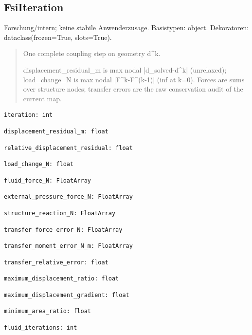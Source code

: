 \subsection{FsiIteration}
Forschung/intern; keine stabile Anwenderzusage.
Basistypen: object. Dekoratoren: dataclass(frozen=True, slots=True).
\begin{quote}
One complete coupling step on geometry d\textasciicircum{}k.\par displacement\_residual\_m is max nodal |d\_solved-d\textasciicircum{}k| (unrelaxed); load\_change\_N is max nodal |F\textasciicircum{}k-F\textasciicircum{}(k-1)| (inf at k=0). Forces are sums over structure nodes; transfer errors are the raw conservation audit of the current map.
\end{quote}
\begin{lstlisting}
iteration: int
\end{lstlisting}
\begin{lstlisting}
displacement_residual_m: float
\end{lstlisting}
\begin{lstlisting}
relative_displacement_residual: float
\end{lstlisting}
\begin{lstlisting}
load_change_N: float
\end{lstlisting}
\begin{lstlisting}
fluid_force_N: FloatArray
\end{lstlisting}
\begin{lstlisting}
external_pressure_force_N: FloatArray
\end{lstlisting}
\begin{lstlisting}
structure_reaction_N: FloatArray
\end{lstlisting}
\begin{lstlisting}
transfer_force_error_N: FloatArray
\end{lstlisting}
\begin{lstlisting}
transfer_moment_error_N_m: FloatArray
\end{lstlisting}
\begin{lstlisting}
transfer_relative_error: float
\end{lstlisting}
\begin{lstlisting}
maximum_displacement_ratio: float
\end{lstlisting}
\begin{lstlisting}
maximum_displacement_gradient: float
\end{lstlisting}
\begin{lstlisting}
minimum_area_ratio: float
\end{lstlisting}
\begin{lstlisting}
fluid_iterations: int
\end{lstlisting}
